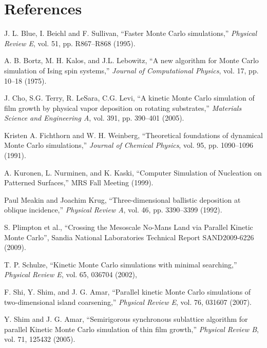 \chapter{References}
\hypertarget{references}{}\label{references}

\begin{DoxyEnumerate}
\item \label{references_Blu95}%
%
J. L. Blue, I. Beichl and F. Sullivan, ``Faster Monte Carlo simulations,'' {\itshape Physical Review E}, vol. 51, pp. R867--R868 (1995).
\item \label{references_Bor75}%
%
A. B. Bortz, M. H. Kalos, and J.\+L. Lebowitz, ``A new algorithm for Monte Carlo simulation of Ising spin systems,'' {\itshape Journal of Computational Physics}, vol. 17, pp. 10--18 (1975).
\item \label{references_Cho05}%
%
J. Cho, S.\+G. Terry, R. Le\+Sara, C.\+G. Levi, ``A kinetic Monte Carlo simulation of film growth by physical vapor deposition on rotating substrates,'' {\itshape Materials Science and Engineering A}, vol. 391, pp. 390--401 (2005).
\item \label{references_Fic91}%
%
Kristen A. Fichthorn and W. H. Weinberg, ``Theoretical foundations of dynamical Monte Carlo simulations,'' {\itshape Journal of Chemical Physics}, vol. 95, pp. 1090--1096 (1991).
\item \label{references_Kur99}%
%
A. Kuronen, L. Nurminen, and K. Kaski, ``Computer Simulation of Nucleation on Patterned Surfaces,'' MRS Fall Meeting (1999).
\item \label{references_Meakin92}%
%
Paul Meakin and Joachim Krug, ``Three-\/dimensional ballistic deposition at oblique incidence,'' {\itshape Physical Review A}, vol. 46, pp. 3390--3399 (1992).
\item \label{references_Plim09}%
%
S. Plimpton et al., ``Crossing the Mesoscale No-\/\+Man\textquotesingle{}s Land via Parallel Kinetic Monte Carlo'', Sandia National Laboratories Technical Report SAND2009-\/6226 (2009).
\item \label{references_Sch02}%
%
T. P. Schulze, ``Kinetic Monte Carlo simulations with minimal searching,'' {\itshape Physical Review E}, vol. 65, 036704 (2002),
\item \label{references_Shi07}%
%
F. Shi, Y. Shim, and J. G. Amar, ``Parallel kinetic Monte Carlo simulations of two-\/dimensional island coarsening,'' {\itshape Physical Review E}, vol. 76, 031607 (2007).
\item \label{references_Shim05}%
%
Y. Shim and J. G. Amar, ``Semirigorous synchronous sublattice algorithm for parallel Kinetic Monte Carlo simulation of thin film growth,'' {\itshape Physical Review B}, vol. 71, 125432 (2005). 
\end{DoxyEnumerate}